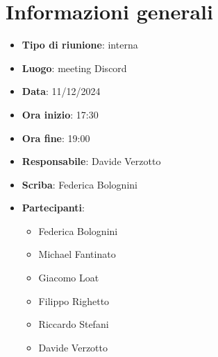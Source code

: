 


\section{Informazioni generali}

\begin{itemize}
    \item \textbf{Tipo di riunione}: interna
    \item \textbf{Luogo}: meeting Discord
    \item \textbf{Data}: 11/12/2024
    \item \textbf{Ora inizio}: 17:30
    \item \textbf{Ora fine}: 19:00
    \item \textbf{Responsabile}: Davide Verzotto
    \item \textbf{Scriba}: Federica Bolognini
    \item \textbf{Partecipanti}:
    \begin{itemize}
        \item Federica Bolognini
        \item Michael Fantinato
        \item Giacomo Loat
        \item Filippo Righetto
        \item Riccardo Stefani
        \item Davide Verzotto
    \end{itemize}
\end{itemize}

